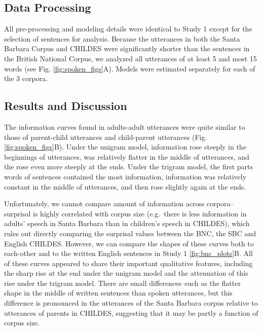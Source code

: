 \documentclass[man,floatsintext]{apa6}
\begin{document}
\hypertarget{data-processing}{%
\subsection{Data Processing}\label{data-processing}}

All pre-processing and modeling details were identical to Study 1 except for the selection of sentences for analysis. Because the utterances in both the Santa Barbara Corpus and CHILDES were significantly shorter than the sentences in the British National Corpus, we analyzed all utterances of at least 5 and most 15 words (see Fig. \ref{fig:spoken_figs}A). Models were estimated separately for each of the 3 corpora.

\hypertarget{results-and-discussion-1}{%
\subsection{Results and Discussion}\label{results-and-discussion-1}}

The information curves found in adults-adult utterances were quite similar to those of parent-child utterances and child-parent utterances (Fig. \ref{fig:spoken_figs}B). Under the unigram model, information rose steeply in the beginnings of utterances, was relatively flatter in the middle of utterances, and the rose even more steeply at the ends. Under the trigram model, the first parts words of sentences contained the most information, information was relatively constant in the middle of utterances, and then rose slightly again at the ends.

Unfortunately, we cannot compare amount of information across corpora--surprisal is highly correlated with corpus size (e.g.~there is less information in adults' speech in Santa Barbara than in children's speech in CHILDES), which rules out directly comparing the surprisal values between the BNC, the SBC and English CHILDES. However, we can compare the shapes of these curves both to each-other and to the written English sentences in Study 1 \ref{fig:bnc_plots}B. All of these curves appeared to share their important qualitative features, including the sharp rise at the end under the unigram model and the attenuation of this rise under the trigram model. There are small differences--such as the flatter shape in the middle of written sentences than spoken utterances, but this difference is pronounced in the utterances of the Santa Barbara corpus relative to utterances of parents in CHILDES, suggesting that it may be partly a function of corpus size.
\end{document}
